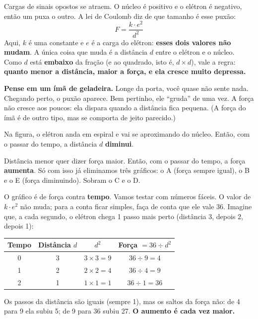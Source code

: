 \begin{enunciado}

\end{enunciado}


\begin{ideia}
Cargas de sinais opostos se atraem. O núcleo é positivo e o elétron é negativo, então um puxa o outro.
A lei de Coulomb diz de que tamanho é esse puxão:
\[ F = \frac{k \cdot e^2}{d^2} \]
Aqui, $k$ é uma constante e $e$ é a carga do elétron: \textbf{esses dois valores não mudam}. A única coisa que muda é a
distância $d$ entre o elétron e o núcleo. Como $d$ está \textbf{embaixo} da fração (e ao quadrado, isto é, $d \times d$), vale a regra:
\textbf{quanto menor a distância, maior a força, e ela cresce muito depressa.}

\textbf{Pense em um ímã de geladeira.} Longe da porta, você quase não sente nada. Chegando perto, o puxão aparece. Bem
pertinho, ele ``gruda'' de uma vez. A força não cresce aos poucos: ela dispara quando a distância fica pequena.
(A força do ímã é de outro tipo, mas se comporta de jeito parecido.)
\end{ideia}

\passoapasso
{}
Na figura, o elétron anda em espiral e vai se aproximando do núcleo. Então, com o passar do tempo, a distância $d$
\textbf{diminui}.

Distância menor quer dizer força maior. Então, com o passar do tempo, a força \textbf{aumenta}.
Só com isso já eliminamos três gráficos: o A (força sempre igual), o B e o E (força diminuindo).
Sobram o C e o D.

O gráfico é de força contra \textbf{tempo}. Vamos testar com números fáceis. O valor de $k \cdot e^2$ não muda; para a conta
ficar simples, faça de conta que ele vale 36. Imagine que, a cada segundo, o elétron chega 1 passo mais perto
(distância 3, depois 2, depois 1):
\begin{conta}
\renewcommand{\arraystretch}{1.3}
\begin{tabular}{cccc}
\textbf{Tempo} & \textbf{Distância $d$} & \textbf{$d^2$} & \textbf{Força $= 36 \div d^2$}\\ \hline
0 & 3 & $3 \times 3 = 9$ & $36 \div 9 = 4$\\
1 & 2 & $2 \times 2 = 4$ & $36 \div 4 = 9$\\
2 & 1 & $1 \times 1 = 1$ & $36 \div 1 = 36$
\end{tabular}
\end{conta}
Os passos da distância são iguais (sempre 1), mas os saltos da força não: de 4 para 9 ela subiu 5; de 9 para 36 subiu 27.
\textbf{O aumento é cada vez maior.}


